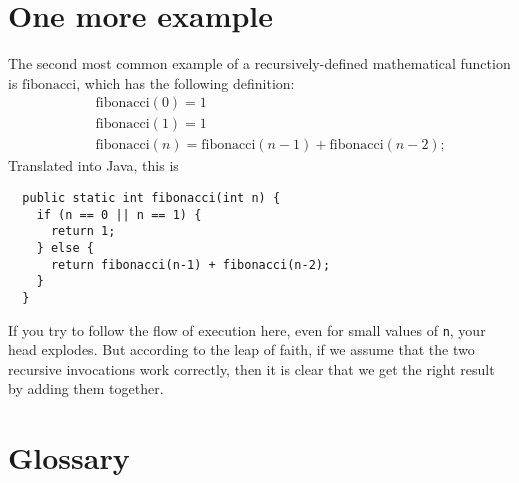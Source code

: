 \documentclass[12pt]{book}
\theoremstyle{definition}
\begin{document}
\section{One more example}
\label{fibonacci}

The second most common example of a recursively-defined
mathematical function is $\mathrm{fibonacci}$, which has the
following definition:
%
\begin{eqnarray*}
&& \mathrm{fibonacci}(0) = 1 \\
&& \mathrm{fibonacci}(1) = 1 \\
&& \mathrm{fibonacci}(n) = \mathrm{fibonacci}(n-1) + \mathrm{fibonacci}(n-2);
\end{eqnarray*}
%
Translated into Java, this is

\begin{lstlisting}
  public static int fibonacci(int n) {
    if (n == 0 || n == 1) {
      return 1;
    } else {
      return fibonacci(n-1) + fibonacci(n-2);
    }
  }
\end{lstlisting}
%
If you try to follow the flow of execution here, even for small
values of {\tt n}, your head explodes.  But according to the leap of
faith, if we assume that the two recursive invocations work correctly, then
it is clear that we get the right result by adding them together.


\section{Glossary}
\end{document}
